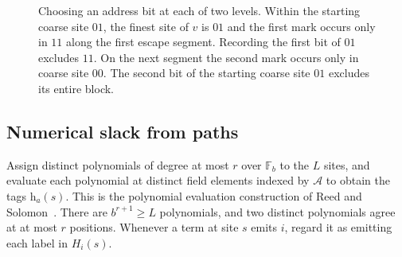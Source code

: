 \begin{figure}[htbp]
\centering
{}
\caption{Choosing an address bit at each of two levels. Within the
starting coarse site \(01\), the finest site of \(v\) is \(01\) and
the first mark occurs only in \(11\) along the first escape segment.
Recording the first bit of \(01\) excludes \(11\). On the next
segment the second mark occurs only in coarse site \(00\). The second
bit of the starting coarse site \(01\) excludes its entire block.}
\label{fig:layer-bits}
\end{figure}

\subsection{Numerical slack from paths}

Assign distinct polynomials of degree at most \(r\) over \(\mathbb F_b\)
to the \(L\) sites, and evaluate each polynomial at distinct field elements
indexed by \(\mathcal A\) to obtain the tags \(\mathrm h_a(s)\). This is
the polynomial evaluation construction of Reed and Solomon~\cite{reedsolomon}.
There are \(b^{r+1}\ge L\) polynomials, and two distinct polynomials agree
at at most \(r\) positions. Whenever a term at site \(s\) emits \(i\),
regard it as emitting each label in \(H_i(s)\).

